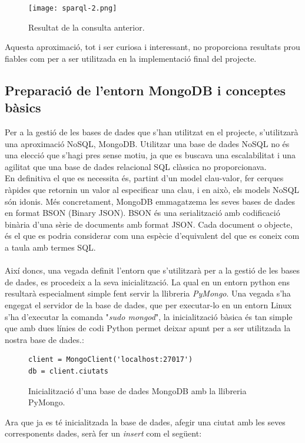 \documentclass[12pt,a4paper,openright,oneside]{article}
\numberwithin{equation}{section}
\theoremstyle{definition}
\begin{document}
\begin{figure}[htbp]
\centering
\texttt{[image: sparql-2.png]}
\caption{Resultat de la consulta anterior.}
\end{figure}
Aquesta aproximació, tot i ser curiosa i interessant, no proporciona resultats prou fiables com per a ser utilitzada en la implementació final del projecte.\cite{dbpedia}
\subsection{Preparació de l'entorn MongoDB i conceptes bàsics}
Per a la gestió de les bases de dades que s'han utilitzat en el projecte, s'utilitzarà una aproximació NoSQL, MongoDB. Utilitzar una base de dades NoSQL no és una elecció que s'hagi pres sense motiu, ja que es buscava una escalabilitat i una agilitat que una base de dades relacional SQL clàssica no proporcionava.\\
En definitiva el que es necessita és, partint d'un model clau-valor, fer cerques ràpides que retornin un valor al especificar una clau, i en això, els models NoSQL són idonis. Més concretament, MongoDB emmagatzema les seves bases de dades en format BSON (Binary JSON). BSON és una serialització amb codificació binària d'una sèrie de documents amb format JSON. Cada document o objecte, és el que es podria considerar com una espècie d'equivalent del que es coneix com a taula amb termes SQL. \\ \\
Així doncs, una vegada definit l'entorn que s'utilitzarà per a la gestió de les bases de dades, es procedeix a la seva inicialització. La qual en un entorn python ens resultarà especialment simple fent servir la llibreria \emph{PyMongo}. Una vegada s'ha engegat el servidor de la base de dades, que per executar-lo en un entorn Linux s'ha d'executar la comanda "\emph{sudo mongod}", la inicialització bàsica és tan simple que amb dues línies de codi Python permet deixar apunt per a ser utilitzada la nostra base de dades.:

\begin{figure}[!htbp]
\begin{verbatim}
client = MongoClient('localhost:27017')
db = client.ciutats
\end{verbatim}
\caption{Inicialització d'una base de dades MongoDB amb la llibreria PyMongo.}
\end{figure}
Ara que ja es té inicialitzada la base de dades, afegir una ciutat amb les seves corresponents dades, serà fer un \emph{insert} com el següent:
\end{document}
